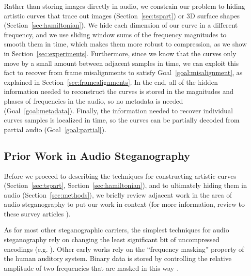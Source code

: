 \documentclass[runningheads]{llncs}
\begin{document}
Rather than storing images directly in audio, we constrain our problem to hiding artistic curves that trace out images (Section~\ref{sec:tspart}) or 3D surface shapes (Section~\ref{sec:hamiltonian}).  We hide each dimension of our curve in a different frequency, and we use sliding window sums of the frequency magnitudes to smooth them in time, which makes them more robust to compression, as we show in Section~\ref{sec:experiments}.  Furthermore, since we know that the curves only move by a small amount between adjacent samples in time, we can exploit this fact to recover from frame misalignments to satisfy Goal~\ref{goal:misalignment}, as explained in Section~\ref{sec:framealignments}.  In the end, all of the hidden information needed to reconstruct the curves is stored in the magnitudes and phases of frequencies in the audio, so no metadata is needed (Goal~\ref{goal:metadata}).  Finally, the information needed to recover individual curves samples is localized in time, so the curves can be partially decoded from partial audio (Goal~\ref{goal:partial}).


\subsection{Prior Work in Audio Steganography}
\label{sec:priorwork}

Before we proceed to describing the techniques for constructing artistic curves (Section~\ref{sec:tspart}, Section~\ref{sec:hamiltonian}), and to ultimately hiding them in audio (Section~\ref{sec:methods}), we briefly review adjacent work in the area of audio steganography to put our work in context (for more information, review to these survey articles \cite{djebbar_comparative_2012, dutta_overview_2020}).

As for most other steganographic carriers, the simplest techniques for audio steganography rely on changing the least significant bit of uncompressed encodings (e.g. \cite{cvejic_wavelet_2002}).  Other early works rely on the ``frequency masking'' property of the human auditory system.  Binary data is stored by controlling the relative amplitude of two frequencies that are masked in this way \cite{gopalan_unified_2009, gopalan2004audio}.
\end{document}
